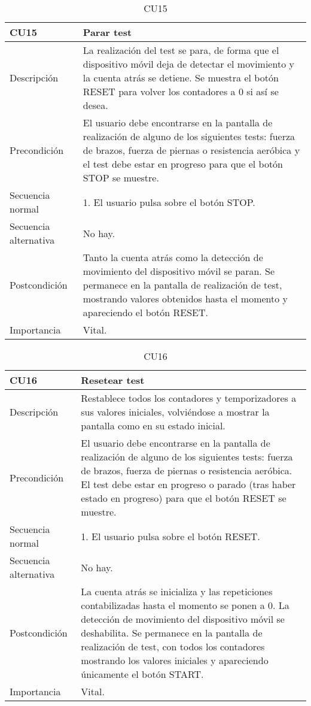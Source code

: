 \begin{table}[H]
\label{CU15}
\begin{center}
\begin{tabular}{| l | p{10cm} |}
\hline
CU15 & Parar test\\
\hline
Descripción & La realización del test se para, de forma que el dispositivo móvil deja de detectar el movimiento y la cuenta atrás se detiene. Se muestra el botón RESET para volver los contadores a 0 si así se desea.\\
\hline
Precondición & El usuario debe encontrarse en la pantalla de realización de alguno de los siguientes tests: fuerza de brazos, fuerza de piernas o resistencia aeróbica y el test debe estar en progreso para que el botón STOP se muestre.\\
\hline
Secuencia normal & 1. El usuario pulsa sobre el botón STOP.\\
\hline
Secuencia alternativa & No hay.\\
\hline
Postcondición & Tanto la cuenta atrás como la detección de movimiento del dispositivo móvil se paran. Se permanece en la pantalla de realización de test, mostrando valores obtenidos hasta el momento y apareciendo el botón RESET.\\
\hline
Importancia & Vital.\\
\hline
\end{tabular}
\end{center}
\caption{CU15}
\end{table}

\begin{table}[H]
\label{CU16}
\begin{center}
\begin{tabular}{| l | p{10cm} |}
\hline
CU16 & Resetear test\\
\hline
Descripción & Restablece todos los contadores y temporizadores a sus valores iniciales, volviéndose a mostrar la pantalla como en su estado inicial.\\
\hline
Precondición & El usuario debe encontrarse en la pantalla de realización de alguno de los siguientes tests: fuerza de brazos, fuerza de piernas o resistencia aeróbica. El test debe estar en progreso o parado (tras haber estado en progreso) para que el botón RESET se muestre.\\
\hline
Secuencia normal & 1. El usuario pulsa sobre el botón RESET.\\
\hline
Secuencia alternativa & No hay.\\
\hline
Postcondición & La cuenta atrás se inicializa y las repeticiones contabilizadas hasta el momento se ponen a 0. La detección de movimiento del dispositivo móvil se deshabilita. Se permanece en la pantalla de realización de test, con todos los contadores mostrando los valores iniciales y apareciendo únicamente el botón START.\\
\hline
Importancia & Vital.\\
\hline
\end{tabular}
\end{center}
\caption{CU16}
\end{table}


